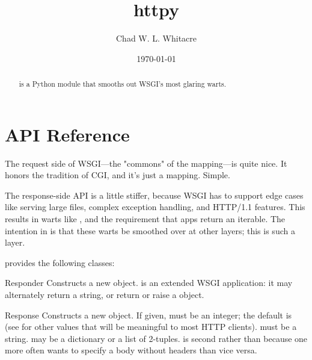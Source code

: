 \documentclass{manual}
\title{httpy}
\author{Chad W. L. Whitacre}
\date\today
\begin{document}
\maketitle

\begin{abstract}

\noindent
{} is a Python module that smooths out WSGI's most glaring warts.

\end{abstract}


\chapter{API Reference \label{api}}

The request side of WSGI---the "commons" of the  mapping---is quite
nice. It honors the tradition of CGI, and it's just a mapping. Simple.

The response-side API is a little stiffer, because WSGI has to support edge
cases like serving large files, complex exception handling, and HTTP/1.1
features. This results in warts like , and the requirement
that apps return an iterable. The intention in  is that these warts be smoothed
over at other layers; this is such a layer.

 provides the following classes:

\begin{classdesc}{Responder}{}
Constructs a new  object.  is an extended WSGI
application: it may alternately return a string, or return or raise a
 object.
\end{classdesc}

\begin{classdesc}{Response}{  }
Constructs a new  object. If given,  must be an
integer; the default is
(see  for other values
that will be meaningful to most HTTP clients).  must be a string.
 may be a dictionary or a list of 2-tuples.  is second
rather than  because one more often wants to specify a body without
headers than vice versa.
\end{classdesc}
\end{document}
